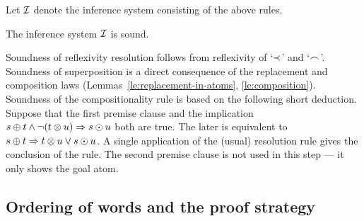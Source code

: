 Let $\mbox {$\cal I$}$ denote the inference system consisting of the above rules. 
\begin{THEOREM} \label{th:soundness}
The inference system $\mbox {$\cal I$}$ is sound.
\end{THEOREM}
\begin{PROOF}
Soundness of reflexivity resolution follows from reflexivity of
 `$\mathbin{\prec}$' and `$\mathbin{\frown}$'. 
Soundness of superposition is a direct consequence of the replacement
and composition laws (Lemmas~\ref{le:replacement-in-atoms}, \ref{le:composition}).
Soundness of the
compositionality
rule is based on the following short deduction. Suppose that the first premise 
clause and the implication
\(s\oplus t \land \neg(t\otimes u)\mathrel\Rightarrow s\odot u\)
both are true. The later is equivalent to
\(s\oplus t \mathrel\Rightarrow t\otimes u \lor s\odot u \).
A single application of the (usual) resolution rule gives the conclusion of the 
rule. The second premise clause is not used in this step --- it only shows the
goal atom.

\end{PROOF}

\subsection{Ordering of words and the proof strategy}\label{sub:ordMax}

